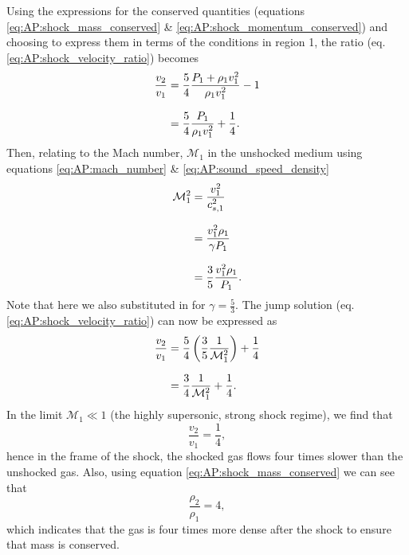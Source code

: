 %
Using the expressions for the conserved quantities (equations \ref{eq:AP:shock_mass_conserved} \& \ref{eq:AP:shock_momentum_conserved}) and choosing to express them in terms of the conditions in region 1, the ratio (eq. \ref{eq:AP:shock_velocity_ratio}) becomes
%
\begin{align*}
	\frac{v_2}{v_1} &= \frac{5}{4} \frac{P_1 + \rho_1 v_1^2}{\rho_1 v_1^2} - 1		
	\linedrop
	&= \frac{5}{4} \frac{P_1}{\rho_1 v_1^2} + \frac{1}{4}	.						
\end{align*}
%
Then, relating to the Mach number, \(\mathcal{M}_1\) in the unshocked medium using equations \ref{eq:AP:mach_number} \& \ref{eq:AP:sound_speed_density}
%
\begin{align*}
	\mathcal{M}_1^2 &= \frac{v_1^2}{c_{s,1}^2}
	\linedrop
	&= \frac{v_1^2 \rho_1}{\gamma P_1}
	\linedrop
	&= \frac{3}{5} \frac{v_1^2 \rho_1}{P_1}.
\end{align*}
%
Note that here we also substituted in for \(\gamma = \frac{5}{3}\).
 The jump solution (eq. \ref{eq:AP:shock_velocity_ratio}) can now be expressed as
%
\begin{align*}
	\frac{v_2}{v_1} &= \frac{5}{4} \left(\frac{3}{5} \frac{1}{\mathcal{M}_1^2}\right) + \frac{1}{4}
	\linedrop
	&= \frac{3}{4} \frac{1}{\mathcal{M}_1^2} + \frac{1}{4}.
\end{align*}
%
In the limit \(\mathcal{M}_1 \ll 1\) (the highly supersonic, strong shock regime), we find that
%
\begin{equation}
	\frac{v_2}{v_1} = \frac{1}{4},
	\label{eq:AP:strong_shock_velocity_ratio}
\end{equation}
%
hence in the frame of the shock, the shocked gas flows four times slower than the unshocked gas.
 Also, using equation \ref{eq:AP:shock_mass_conserved} we can see that
%
\begin{equation}
	\frac{\rho_2}{\rho_1} = 4,
	\label{eq:AP:strong_shock_density_ratio}
\end{equation}
%
which indicates that the gas is four times more dense after the shock to ensure that mass is conserved.
%
